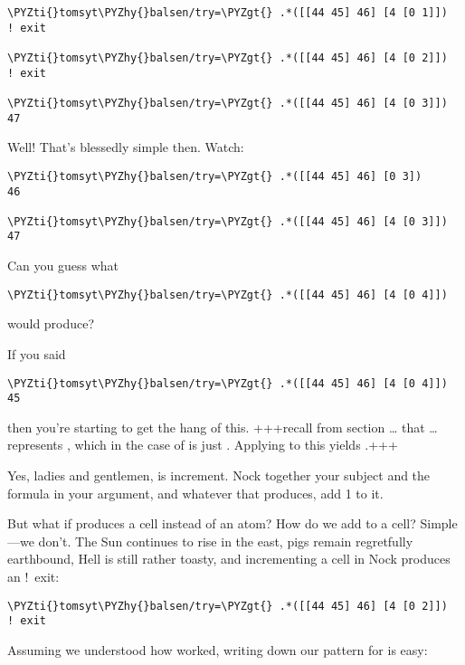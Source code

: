 \begin{framed_shaded}
\begin{Verbatim}[fontsize=\relsize{-2.5},commandchars=\\\{\}]
\PYZti{}tomsyt\PYZhy{}balsen/try=\PYZgt{} .*([[44 45] 46] [4 [0 1]])
! exit

\PYZti{}tomsyt\PYZhy{}balsen/try=\PYZgt{} .*([[44 45] 46] [4 [0 2]])
! exit

\PYZti{}tomsyt\PYZhy{}balsen/try=\PYZgt{} .*([[44 45] 46] [4 [0 3]])
47
\end{Verbatim}
\end{framed_shaded}
Well! That's blessedly simple then. Watch:
\begin{framed_shaded}
\begin{Verbatim}[fontsize=\relsize{-2.5},commandchars=\\\{\}]
\PYZti{}tomsyt\PYZhy{}balsen/try=\PYZgt{} .*([[44 45] 46] [0 3])
46

\PYZti{}tomsyt\PYZhy{}balsen/try=\PYZgt{} .*([[44 45] 46] [4 [0 3]])
47
\end{Verbatim}
\end{framed_shaded}
Can you guess what
\begin{framed_shaded}
\begin{Verbatim}[fontsize=\relsize{-2.5},commandchars=\\\{\}]
\PYZti{}tomsyt\PYZhy{}balsen/try=\PYZgt{} .*([[44 45] 46] [4 [0 4]])
\end{Verbatim}
\end{framed_shaded}
would produce?

If you said
\begin{framed_shaded}
\begin{Verbatim}[fontsize=\relsize{-2.5},commandchars=\\\{\}]
\PYZti{}tomsyt\PYZhy{}balsen/try=\PYZgt{} .*([[44 45] 46] [4 [0 4]])
45
\end{Verbatim}
\end{framed_shaded}
then you're starting to get the hang of this. +++recall from section \ldots{} that \ldots{} represents , which in the case of \kode{[[44 45] 46]} is just . Applying  to this yields .+++

Yes, ladies and gentlemen,  is increment. Nock together your subject and the formula in your argument,
and whatever that produces, add 1 to it.

But what if  produces a cell instead of an atom? How do we
add  to a cell? Simple---we don't. The Sun continues to rise in the east,
pigs remain regretfully earthbound, Hell is still rather toasty, and
incrementing a cell in Nock produces an !\ exit:
\begin{framed_shaded}
\begin{Verbatim}[fontsize=\relsize{-2.5},commandchars=\\\{\}]
\PYZti{}tomsyt\PYZhy{}balsen/try=\PYZgt{} .*([[44 45] 46] [4 [0 2]])
! exit
\end{Verbatim}
\end{framed_shaded}
Assuming we understood how  worked, writing down our pattern for  is easy:

